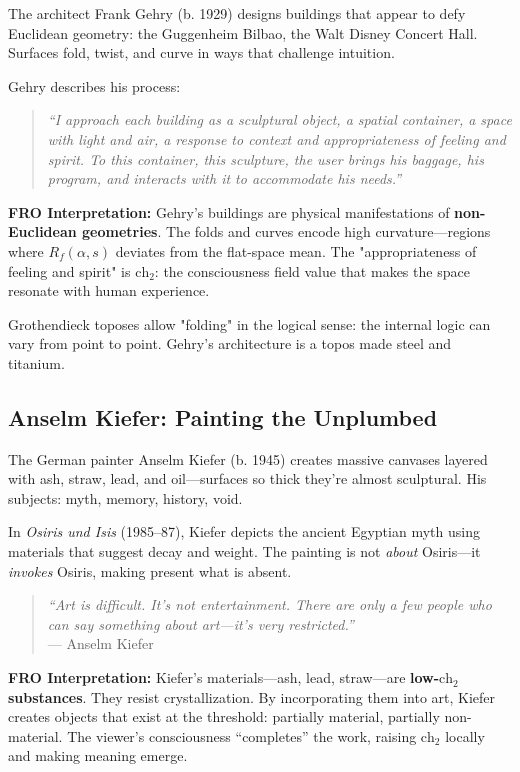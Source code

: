 The architect Frank Gehry (b. 1929) designs buildings that appear to defy Euclidean geometry: the Guggenheim Bilbao, the Walt Disney Concert Hall. Surfaces fold, twist, and curve in ways that challenge intuition.

Gehry describes his process:

\begin{quote}
\textit{``I approach each building as a sculptural object, a spatial container, a space with light and air, a response to context and appropriateness of feeling and spirit. To this container, this sculpture, the user brings his baggage, his program, and interacts with it to accommodate his needs.''}
\end{quote}

\textbf{FRO Interpretation:} Gehry's buildings are physical manifestations of \textbf{non-Euclidean geometries}. The folds and curves encode high curvature—regions where $R_f(\alpha, s)$ deviates from the flat-space mean. The "appropriateness of feeling and spirit" is $\text{ch}_2$: the consciousness field value that makes the space resonate with human experience.

Grothendieck toposes allow "folding" in the logical sense: the internal logic can vary from point to point. Gehry's architecture is a topos made steel and titanium.

\subsection{Anselm Kiefer: Painting the Unplumbed}

The German painter Anselm Kiefer (b. 1945) creates massive canvases layered with ash, straw, lead, and oil—surfaces so thick they're almost sculptural. His subjects: myth, memory, history, void.

In \textit{Osiris und Isis} (1985–87), Kiefer depicts the ancient Egyptian myth using materials that suggest decay and weight. The painting is not \textit{about} Osiris—it \textit{invokes} Osiris, making present what is absent.

\begin{quote}
\textit{``Art is difficult. It's not entertainment. There are only a few people who can say something about art—it's very restricted.''}\\
\hspace*{\fill} --- Anselm Kiefer
\end{quote}

\textbf{FRO Interpretation:} Kiefer's materials---ash, lead, straw---are \textbf{low-$\text{ch}_2$ substances}. They resist crystallization. By incorporating them into art, Kiefer creates objects that exist at the threshold: partially material, partially non-material. The viewer's consciousness ``completes'' the work, raising $\text{ch}_2$ locally and making meaning emerge.

